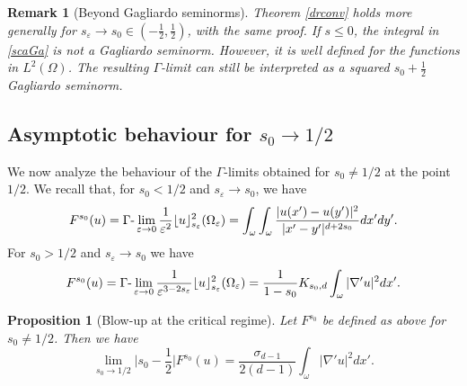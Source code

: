 \documentclass[11pt]{article}
\newtheorem{proposition}[definition]{Proposition}
\newtheorem{corollary}[definition]{Corollary}
\newtheorem{remark}[definition]{Remark}
\def\e{\varepsilon}
\begin{document}
\begin{remark}[Beyond Gagliardo seminorms]\rm
Theorem \ref{drconv} holds more generally for $s_\e\to s_0\in(-\frac12, \frac12)$, with the same proof. If $s\le 0$, the integral in \eqref{scaGa} is not a Gagliardo seminorm. However, it is well defined for the functions in $L^2(\Omega)$. The resulting $\Gamma$-limit can still be interpreted as a squared $s_0+\frac12$ Gagliardo seminorm. 
\end{remark}


\subsection{Asymptotic behaviour for $s_0\to 1/2$}
We now analyze the behaviour of the $\Gamma$-limits obtained for $s_0\neq1/2$ at the point $1/2$. We recall that, for $s_0<1/2$ and $s_\e\to s_0$, we have 
$$
F^{s_0}(u)=\Gamma\hbox{-}\lim_{\e\to 0}\frac{1}{\e^{2}}\lfloor u\rfloor_{s_\e}^2(\Omega_\e)
=\int_\omega\int_\omega 
\frac{|u(x')-u(y')|^2}{|x'-y'|^{d+2s_0}}dx' dy'.
$$
For $s_0>1/2$ and $s_\e\to s_0$ we have 
$$
F^{s_0}(u)=\Gamma\hbox{-}\lim_{\e\to 0}\frac{1}{\e^{3-2s_\e}}\lfloor u\rfloor_{s_\e}^2(\Omega_\e)=\frac1{1-s_0}K_{s_0,d}\int_\omega |\nabla'u|^2dx'.
$$

\begin{proposition}[Blow-up at the critical regime]
 Let $F^{s_0}$ be defined as above for $s_0\neq1/2$. Then we have
 $$
 \lim_{s_0\to1/2}\Big|s_0-\frac12\Big|F^{s_0}(u)=\frac{
\sigma_{d-1}}{2(d-1)}\int_\omega |\nabla'u|^2dx'.
 $$
\end{proposition}
\end{document}
